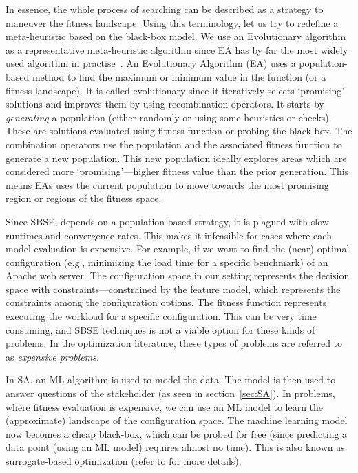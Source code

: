 \documentclass[table, xcdraw, sigconf,review, anonymous]{acmart}
\begin{document}
In essence, the whole process of searching can be described as a strategy to maneuver the fitness landscape. Using this terminology, let us try to redefine a meta-heuristic based on the black-box model. We use an Evolutionary algorithm as a representative meta-heuristic algorithm since EA has by far the most widely used algorithm in practise~\cite{nair2016accidental}.
An Evolutionary Algorithm (EA) uses a population-based method to find the maximum or minimum value in the function (or a fitness landscape). It is called evolutionary since it iteratively selects `promising' solutions and improves them by using recombination operators. It starts by \textit{generating} a population (either randomly or using some heuristics or checks). These are solutions evaluated using fitness function or probing the black-box. The combination operators use the population and the associated fitness function to generate a new population. This new population ideally explores areas which are considered more `promising'---higher fitness value than the prior generation. This means EAs uses the current population to move towards the most promising region or regions of the fitness space. 

Since SBSE, depends on a population-based strategy, it is plagued with slow runtimes and convergence rates. This makes it infeasible for cases where each model evaluation is expensive. For example, if we want to find the (near) optimal configuration (e.g., minimizing the load time for a specific benchmark) of an Apache web server. The configuration space in our setting represents the decision space with constraints---constrained by the feature model, which represents the constraints among the configuration options. The fitness function represents executing the workload for a specific configuration. This can be very time consuming, and SBSE techniques is not a viable option for these kinds of problems. In the optimization literature, these types of problems are referred to as \textit{expensive problems}. 

In SA, an ML algorithm is used to model the data. The model is then used to answer questions of the stakeholder (as seen in section~\ref{sec:SA}). In problems, where fitness evaluation is expensive, we can use an ML model to learn the (approximate) landscape of the configuration space. The machine learning model now becomes a cheap black-box, which can be probed for free (since predicting a data point (using an ML model) requires almost no time). This is also known as surrogate-based optimization (refer to \cite{jin2011surrogate} for more details). 
\end{document}
